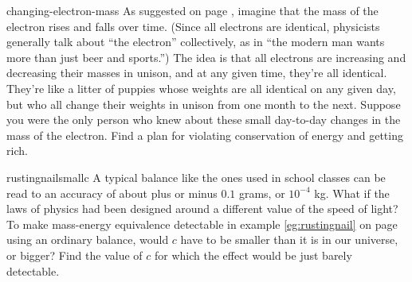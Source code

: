 \begin{hwsection}
\begin{hw}{changing-electron-mass}
As suggested on page \pageref{text:changing-electron-mass}, imagine that the mass of
the electron rises and falls over time. (Since all electrons are identical, physicists
generally talk about ``the electron'' collectively, as in ``the modern man wants more
than just beer and sports.'') The idea is that all electrons are increasing and
decreasing their masses in unison, and at any given time, they're all identical. They're
like a litter of puppies whose weights are all identical on any given day, but who all
change their weights in unison from one month to the next.
Suppose you were the only person who knew about these small day-to-day changes in the
mass of the electron. Find a plan for violating conservation of energy and getting
rich.
\end{hw}

\begin{hw}{rustingnailsmallc}
A typical balance like the ones used in school classes can be read to an accuracy
of about plus or minus $0.1$ grams, or $10^{-4}$ kg. What if the laws of physics had been
designed around a different value of the speed of light? To make mass-energy
equivalence detectable in example \ref{eg:rustingnail} on page \pageref{eg:rustingnail}
using an ordinary balance, would $c$ have to be smaller than it is in our universe,
or bigger? Find the value of $c$ for which the effect would be just barely detectable.
\end{hw}


\end{hwsection}
